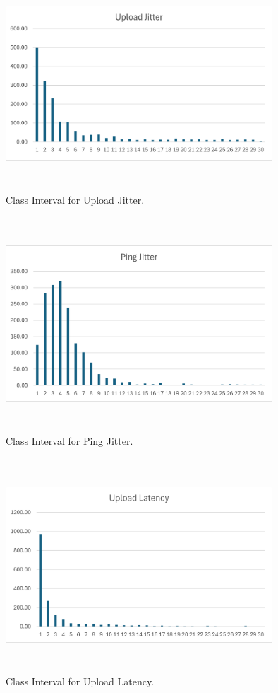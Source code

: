 \documentclass[conference]{IEEEtran}
\begin{document}
\begin{figure}[htbp]
    \centerline{\includegraphics[width=10cm,height=8cm,keepaspectratio]{Figures/Picture29.png}}
    \caption{Class Interval for Upload Jitter.}
    \label{fig17}
\end{figure}

\begin{figure}[htbp]
    \centerline{\includegraphics[width=10cm,height=8cm,keepaspectratio]{Figures/Picture30.png}}
    \caption{Class Interval for Ping Jitter.}
    \label{fig17}
\end{figure}

\begin{figure}[htbp]
    \centerline{\includegraphics[width=10cm,height=8cm,keepaspectratio]{Figures/Picture31.png}}
    \caption{Class Interval for Upload Latency.}
    \label{fig17}
\end{figure}
\end{document}
